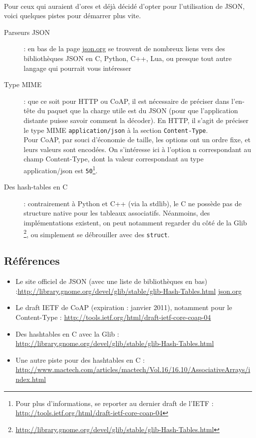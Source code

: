 \documentclass[a4paper,11pt]{article}
\begin{document}
\paragraph{}
Pour ceux qui auraient d'ores et déjà décidé d'opter pour l'utilisation de JSON, voici quelques pistes pour démarrer plus vite.\\
\begin{description}
	\item[Parseurs JSON] : en bas de la page \url{json.org} se trouvent de nombreux liens vers des bibliothèques JSON en C, Python, C++, Lua, ou presque tout autre langage qui pourrait vous intéresser

	\item[Type MIME] : que ce soit pour HTTP ou CoAP, il est nécessaire de préciser dans l'en-tête du paquet que la charge utile est du JSON (pour que l'application distante puisse savoir comment la décoder). En HTTP, il s'agit de préciser le type MIME \texttt{application/json} à la section \texttt{Content-Type}.\\
		Pour CoAP, par souci d'économie de taille, les options ont un ordre fixe, et leurs valeurs sont encodées. On s'intéresse ici à l'option n correspondant au champ Content-Type, dont la valeur correspondant au type application/json est \texttt{50}\footnote{Pour plus d'informations, se reporter au dernier draft de l'IETF : \url{http://tools.ietf.org/html/draft-ietf-core-coap-04}}.
		
	\item[Des hash-tables en C] : contrairement à Python et C++ (via la stdlib), le C ne possède pas de structure native pour les tableaux associatifs. Néanmoins, des implémentations existent, on peut notamment regarder du côté de la Glib \footnote{\url{http://library.gnome.org/devel/glib/stable/glib-Hash-Tables.html}}, ou simplement se débrouiller avec des \texttt{struct}.
\end{description}


\subsection{Références}
\begin{itemize}
	\item Le site officiel de JSON (avec une liste de bibliothèques en bas) :\url{http://library.gnome.org/devel/glib/stable/glib-Hash-Tables.html} \url{json.org}
	\item Le draft IETF de CoAP (expiration : janvier 2011), notamment pour le Content-Type : \url{http://tools.ietf.org/html/draft-ietf-core-coap-04}
	\item Des hashtables en C avec la Glib : \url{http://library.gnome.org/devel/glib/stable/glib-Hash-Tables.html}
	\item Une autre piste pour des hashtables en C : \url{http://www.mactech.com/articles/mactech/Vol.16/16.10/AssociativeArrays/index.html}
\end{itemize}
\end{document}
